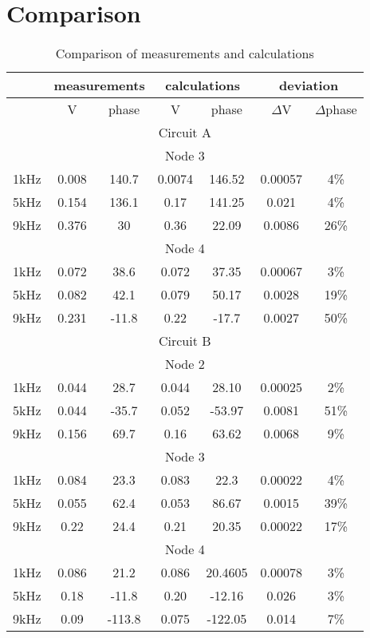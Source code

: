 \documentclass[notitlepage, a4paper, 11pt]{article}
\begin{document}
	\section{Comparison}\label{sec:comparison}
	\begin{table}[H]\label{tab:comp}
		\centering
		\begin{tabular}{|c|c|c|c|c|c|c|}
			\hline
			& \multicolumn{2}{|c|}{measurements} & \multicolumn{2}{|c|}{calculations}  & \multicolumn{2}{|c|}{deviation}  \\
			\hline
			& V & phase & V & phase & $\Delta$V & $\Delta$phase\\
			\hline
			\multicolumn{7}{|c|}{Circuit A} \\
			\hline
			\multicolumn{7}{|c|}{Node 3} \\
			\hline
			1kHz & 0.008 & 140.7 & 0.0074 & 146.52 & 0.00057 & 4\% \\
			\hline
			5kHz & 0.154 & 136.1 & 0.17 & 141.25 & 0.021 & 4\% \\
			\hline
			9kHz & 0.376 & 30 & 0.36 & 22.09 & 0.0086 & 26\% \\
			\hline
			\multicolumn{7}{|c|}{Node 4} \\
			\hline
			1kHz & 0.072 & 38.6 & 0.072 & 37.35 & 0.00067 & 3\% \\
			\hline
			5kHz & 0.082 & 42.1 & 0.079 & 50.17 & 0.0028 & 19\% \\
			\hline
			9kHz & 0.231 & -11.8 & 0.22 & -17.7 & 0.0027 & 50\% \\
			\hline
			\multicolumn{7}{|c|}{Circuit B} \\
			\hline
			\multicolumn{7}{|c|}{Node 2} \\
			\hline
			1kHz & 0.044 & 28.7 & 0.044 & 28.10 & 0.00025 & 2\% \\
			\hline
			5kHz & 0.044 & -35.7 & 0.052 & -53.97 & 0.0081 & 51\% \\
			\hline
			9kHz & 0.156 & 69.7 & 0.16 & 63.62 & 0.0068 & 9\% \\
			\hline
			\multicolumn{7}{|c|}{Node 3} \\
			\hline
			1kHz & 0.084 & 23.3 & 0.083 & 22.3 & 0.00022 & 4\% \\
			\hline
			5kHz & 0.055 & 62.4 & 0.053 & 86.67 & 0.0015 & 39\% \\
			\hline
			9kHz & 0.22 & 24.4 & 0.21 & 20.35 & 0.00022 & 17\% \\
			\hline
			\multicolumn{7}{|c|}{Node 4} \\
			\hline
			1kHz & 0.086 & 21.2 & 0.086 & 20.4605 & 0.00078 & 3\% \\
			\hline
			5kHz & 0.18 & -11.8 & 0.20 & -12.16 & 0.026 & 3\% \\
			\hline
			9kHz & 0.09 & -113.8 & 0.075 & -122.05 & 0.014 & 7\% \\
			\hline
		\end{tabular}
		\caption{Comparison of measurements and calculations}
	\end{table}
\end{document}
